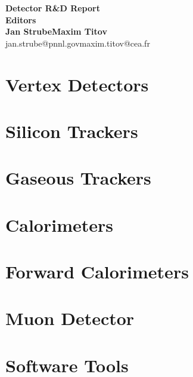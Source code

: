\documentclass[10pt,final]{report}
\begin{document}
\begin{titlepage}
    \begin{center}
        \textbf{\huge Detector R\&D Report}\\
        \vspace{1.5cm}
        \textbf{\Large Editors}\\
        \textbf{\Large Jan Strube\qquad Maxim Titov} \\
        jan.strube@pnnl.gov\qquad maxim.titov@cea.fr \\
    \end{center}
\end{titlepage}
\tableofcontents
\chapter{Vertex Detectors}








\newpage


\newpage
\chapter{Silicon Trackers}




\chapter{Gaseous Trackers}



\chapter{Calorimeters}












\chapter{Forward Calorimeters}


\chapter{Muon Detector}

\chapter{Software Tools}






\printbibliography
\end{document}
